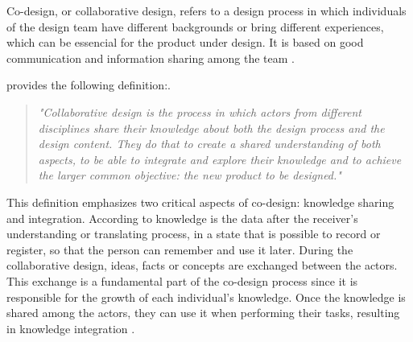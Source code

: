 Co-design, or collaborative design, refers to a design process in which individuals of the design team have different backgrounds or bring different experiences, which can be essencial for the product under design. It is based on good communication and information sharing among the team \cite{chiu2002organizational}.

 provides the following definition:.

\begin{quote}
    \textit{"Collaborative design is the process in which actors from different disciplines share their knowledge about both the design process and the design content. They do that to create a shared understanding of both aspects, to be able to integrate and explore their knowledge and to achieve the larger common objective: the new product to be designed."} %
\end{quote}

This definition emphasizes two critical aspects of co-design: knowledge sharing and integration. According to  knowledge is the data after the receiver's understanding or translating process, in a state that is possible to record or register, so that the person can remember and use it later. During the collaborative design, ideas, facts or concepts are exchanged between the actors. This exchange is a fundamental part of the co-design process since it is responsible for the growth of each individual's knowledge. Once the knowledge is shared among the actors, they can use it when performing their tasks, resulting in knowledge integration \cite{kleinsmann2006understanding}.